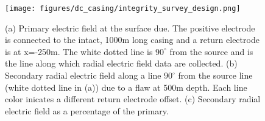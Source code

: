\begin{figure}
    \begin{center}
    \texttt{[image: figures/dc\_casing/integrity\_survey\_design.png]}
    \end{center}
\caption{
    (a) Primary electric field at the surface due.
    The positive electrode is connected to the intact,
    1000m long casing and a return electrode is at x=-250m. The white dotted
    line is $90^\circ$ from the source and is the line along which radial electric field
    data are collected.
    (b) Secondary radial electric field along a line $90^{\circ}$ from the source line (white dotted line in (a))
    due to a flaw at 500m depth. Each line color inicates a different return electrode offset.
    (c) Secondary radial electric field as a percentage of the primary.
}
\label{fig:integrity_survey_design}
\end{figure}
